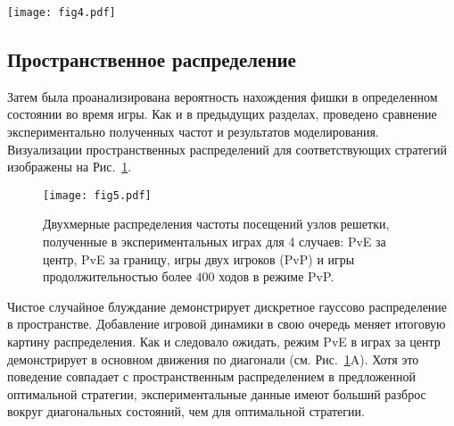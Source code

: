 \begin{figure*}[t]
    \centering
    \texttt{[image: fig4.pdf]}
    \caption{
        Распределение времени поглощения для режима PvP (желтая гистограмма и фиолетовая линия) 
        по сравнению с моделированием частот направлений движения (зеленая линия) и частот стратегий (синяя линия), 
        наблюдаемых в длительных играх (более $400$ ходов). Частоты направлений движения для каждого состояния, полученные в 
        экспериментальных длинных играх, использовались для моделирования эволюции вероятностей найти фишку в узлах решетки. 
        Стратегии обоих игроков A и B в PvP с длиной ходов более $400$ использовались отдельно при моделировании.
    }  
    \label{fig:distribution_time_PvP}

\end{figure*}

\subsection{Пространственное распределение}\label{sec:ch3/sec3/sub3}

Затем была проанализирована вероятность нахождения фишки в определенном состоянии во время игры. 
Как и в предыдущих разделах, проведено сравнение экспериментально полученных частот и результатов моделирования. 
Визуализации пространственных распределений для соответствующих стратегий изображены на Рис.~\cref{fig:distribution_states}.

\begin{figure}[t]
    \centering
    \texttt{[image: fig5.pdf]}
    \caption{
        Двухмерные распределения частоты посещений узлов решетки, полученные в экспериментальных играх для 4 случаев: 
        PvE за центр, PvE за границу, игры двух игроков (PvP) и игры продолжительностью более $400$ ходов в режиме PvP.
    }  
    \label{fig:distribution_states}
    
\end{figure}

Чистое случайное блуждание демонстрирует дискретное гауссово распределение в пространстве. 
Добавление игровой динамики в свою очередь меняет итоговую картину распределения. 
Как и следовало ожидать, режим PvE в играх за центр демонстрирует в основном движения по диагонали (см. Рис.~\cref{fig:distribution_states}A). 
Хотя это поведение совпадает с пространственным распределением в предложенной оптимальной стратегии, 
экспериментальные данные имеют больший разброс вокруг диагональных состояний, чем для оптимальной стратегии.

